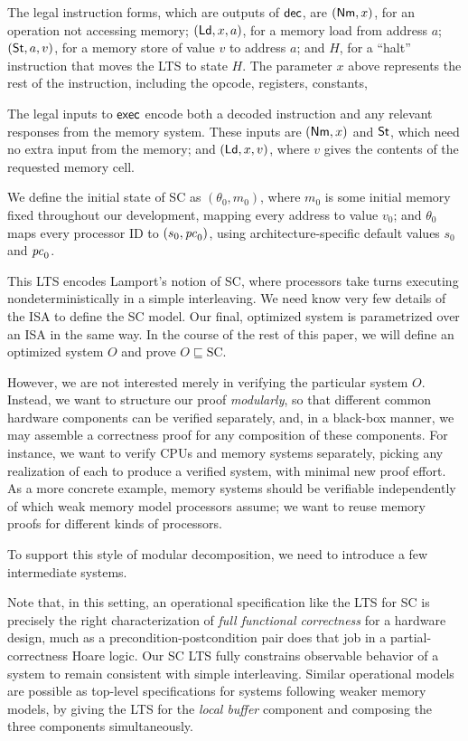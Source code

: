 The legal instruction forms, which are outputs of $\mathsf{dec}$, are $(\mathsf{Nm}, x)$, for
an operation not accessing memory; $(\mathsf{Ld}, x, a)$, for a memory load from
address $a$; $(\mathsf{St}, a, v)$, for a memory store of value $v$ to address $a$; and
$H$, for a ``halt'' instruction that moves the LTS to state $H$. The parameter
$x$ above represents the rest of the instruction, including the
opcode, registers, constants, \etc{}

The legal inputs to $\mathsf{exec}$ encode both a decoded instruction and any relevant
responses from the memory system.  These inputs are $(\mathsf{Nm}, x)$ and $\mathsf{St}$, which
need no extra input from the memory; and $(\mathsf{Ld}, x, v)$, where $v$ gives the
contents of the requested memory cell.

We define the initial state of SC as $(\theta_0, m_0)$, where $m_0$ is
some initial memory fixed throughout our development, mapping every
address to value $v_0$; and $\theta_0$ maps every processor ID to
$(s_0, \mathit{pc}_0)$, using architecture-specific default values $s_0$ and
$\mathit{pc}_0$.

\medskip

This LTS encodes Lamport's notion of SC, where processors take turns executing
nondeterministically in a simple interleaving.  We need know very few details
of the ISA to define the SC model.  Our final, optimized system is parametrized
over an ISA in the same way.  In the course of the rest of this paper, we will
define an optimized system $O$ and prove $O \sqsubseteq \text{SC}$.

However, we are not interested merely in verifying the particular system $O$.
Instead, we want to structure our proof \emph{modularly}, so that different
common hardware components can be verified separately, and, in a black-box
manner, we may assemble a correctness proof for any composition of these
components.  For instance, we want to verify CPUs and memory systems
separately, picking any realization of each to produce a verified system, with
minimal new proof effort. As a more concrete example, memory systems should be
verifiable independently of which weak memory model processors assume; we want
to reuse memory proofs for different kinds of processors.

To support this style of modular decomposition, we need to introduce a few
intermediate systems.

Note that, in this setting, an operational specification like the LTS
for SC is precisely the right characterization of \emph{full functional
  correctness} for a hardware design, much as a
precondition-postcondition pair does that job in a partial-correctness
Hoare logic.  Our SC LTS fully constrains observable behavior of a
system to remain consistent with simple interleaving.  Similar
operational models are possible as top-level specifications for
systems following weaker memory models, by giving the LTS for the \emph{local
buffer} component and composing the three components simultaneously.

